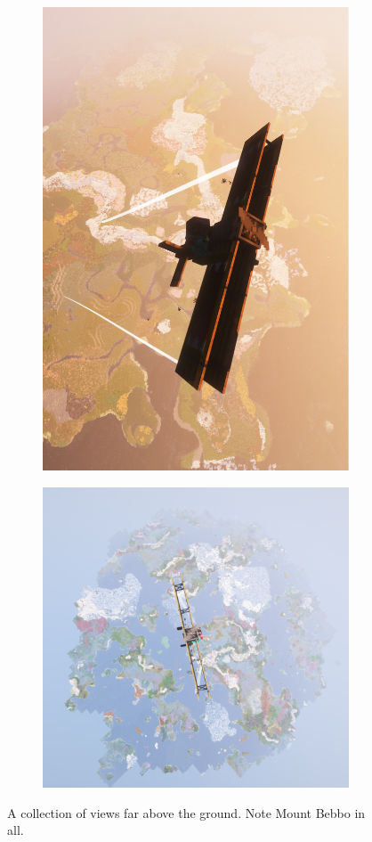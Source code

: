 \begin{figure}
	\begin{subfigure}[t]{0.3\linewidth}
		\centering
   	 \includegraphics[width=0.7\linewidth]{Biplane over Mount Bebbo at Sunset.png}  %
   	 
	\end{subfigure}
	\begin{subfigure}[t]{0.3\linewidth}
		\centering
		\includegraphics[width=1.5\linewidth]{Mount Bebbo from 10KM.png}  %
	\end{subfigure}
	\caption{A collection of views far above the ground. Note Mount Bebbo in all.}
\end{figure}

